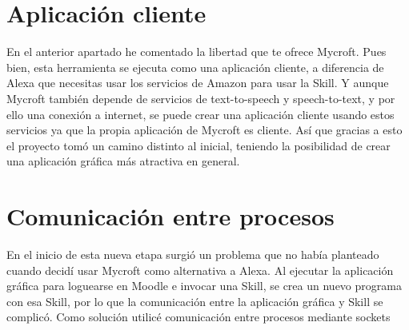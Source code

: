 \section{Aplicación cliente}
En el anterior apartado he comentado la libertad que te ofrece Mycroft. Pues bien, esta herramienta se ejecuta como una aplicación cliente, a diferencia de Alexa que necesitas usar los servicios de Amazon para usar la Skill. Y aunque Mycroft también depende de servicios de text-to-speech y speech-to-text, y por ello una conexión a internet, se puede crear una aplicación cliente usando estos servicios ya que la propia aplicación de Mycroft es cliente.
Así que gracias a esto el proyecto tomó un camino distinto al inicial, teniendo la posibilidad de crear una aplicación gráfica más atractiva en general.
\section{Comunicación entre procesos}
En el inicio de esta nueva etapa surgió un problema que no había planteado cuando decidí usar Mycroft como alternativa a Alexa. Al ejecutar la aplicación gráfica para loguearse en Moodle e invocar una Skill, se crea un nuevo programa con esa Skill, por lo que la comunicación entre la aplicación gráfica y Skill se complicó. Como solución utilicé comunicación entre procesos mediante sockets